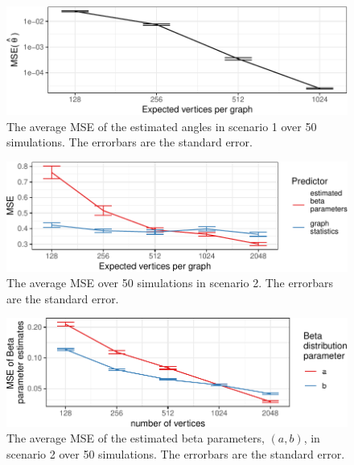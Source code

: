 \documentclass[12pt]{article}
\begin{document}
\begin{figure}[H]

{\centering \includegraphics{draft_files/figure-latex/theta-mse-1} 

}

\caption{The average MSE of the estimated angles in scenario 1 over 50 simulations. The errorbars are the standard error.}\label{fig:theta-mse}
\end{figure}

\begin{figure}[H]

{\centering \includegraphics{draft_files/figure-latex/beta-regression-sim-1} 

}

\caption{The average MSE over 50 simulations in scenario 2. The errorbars are the standard error.}\label{fig:beta-regression-sim}
\end{figure}

\begin{figure}[H]

{\centering \includegraphics{draft_files/figure-latex/beta-mse-1} 

}

\caption{The average MSE of the estimated beta parameters, $(a, b)$, in scenario 2 over 50 simulations. The errorbars are the standard error.}\label{fig:beta-mse}
\end{figure}
\end{document}

